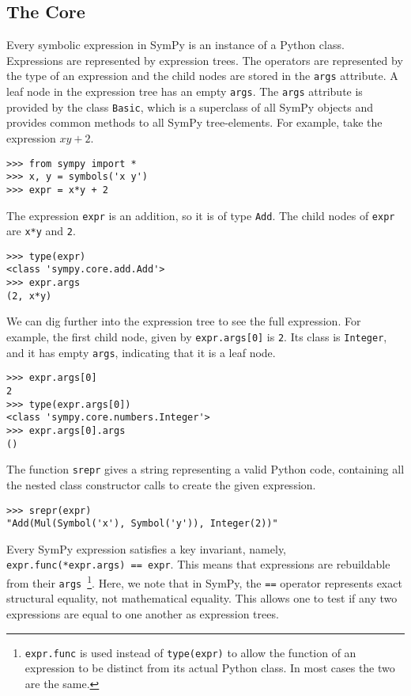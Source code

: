 

\subsection{The Core}

Every symbolic expression in SymPy is an instance of a Python class.
Expressions are represented by expression trees. The operators are represented
by the type of an expression and the child nodes are stored in the
\texttt{args} attribute. A leaf node in the expression tree has an empty
\texttt{args}.
The \texttt{args} attribute is provided by the class \texttt{Basic},
which is a superclass of all SymPy objects and
provides common methods to all SymPy tree-elements.
For example, take the expression $xy + 2$.

\begin{verbatim}
>>> from sympy import *
>>> x, y = symbols('x y')
>>> expr = x*y + 2
\end{verbatim}

The expression \texttt{expr} is an addition, so it is of type \texttt{Add}. The child
nodes of \texttt{expr} are \texttt{x*y} and \texttt{2}.

\begin{verbatim}
>>> type(expr)
<class 'sympy.core.add.Add'>
>>> expr.args
(2, x*y)
\end{verbatim}

We can dig further into the expression tree to see the full expression. For
example, the first child node, given by \texttt{expr.args[0]} is
\texttt{2}. Its class is \texttt{Integer}, and it has empty \texttt{args},
indicating that it is a leaf node.

\begin{verbatim}
>>> expr.args[0]
2
>>> type(expr.args[0])
<class 'sympy.core.numbers.Integer'>
>>> expr.args[0].args
()
\end{verbatim}

The function \texttt{srepr} gives a string representing a valid Python code,
containing all the nested class constructor calls to create the given expression.

\begin{verbatim}
>>> srepr(expr)
"Add(Mul(Symbol('x'), Symbol('y')), Integer(2))"
\end{verbatim}

Every SymPy expression satisfies a key invariant, namely,
\verb|expr.func(*expr.args) == expr|. This means that expressions are
rebuildable from their \texttt{args}~\footnote{\texttt{expr.func} is used
  instead of \texttt{type(expr)} to allow the function of an expression to be
  distinct from its actual Python class. In most cases the two are the same.}.
Here, we note that in SymPy, the \texttt{==} operator represents exact
structural equality, not mathematical equality. This allows one to test if any
two expressions are equal to one another as expression trees.

